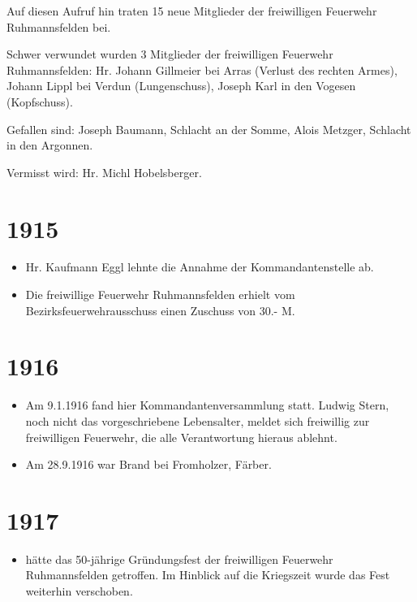 \documentclass[12pt,a4paper]{book}
\begin{document}
Auf diesen Aufruf hin traten 15 neue Mitglieder der freiwilligen Feuerwehr
Ruhmannsfelden bei.

Schwer verwundet wurden 3 Mitglieder der freiwilligen Feuerwehr Ruhmannsfelden:
Hr. Johann Gillmeier bei Arras (Verlust des rechten Armes), Johann Lippl bei
Verdun (Lungenschuss), Joseph Karl in den Vogesen (Kopfschuss).

Gefallen sind: Joseph Baumann, Schlacht an der Somme, Alois Metzger, Schlacht in
den Argonnen.

Vermisst wird: Hr. Michl Hobelsberger.

\section*{1915}

\begin{itemize}
\item Hr. Kaufmann Eggl lehnte die Annahme der Kommandantenstelle ab.

\item Die freiwillige Feuerwehr Ruhmannsfelden erhielt vom
Bezirksfeuerwehrausschuss einen Zuschuss von 30.- M.
\end{itemize}

\section*{1916}

\begin{itemize}
\item Am 9.1.1916 fand hier Kommandantenversammlung statt. Ludwig Stern, noch
nicht das vorgeschriebene Lebensalter, meldet sich freiwillig zur freiwilligen
Feuerwehr, die alle Verantwortung hieraus ablehnt.

\item Am 28.9.1916 war Brand bei Fromholzer, Färber.
\end{itemize}

\section*{1917}

\begin{itemize}
\item hätte das 50-jährige Gründungsfest der freiwilligen Feuerwehr
Ruhmannsfelden getroffen. Im Hinblick auf die Kriegszeit wurde das Fest
weiterhin verschoben.
\end{itemize}
\end{document}
